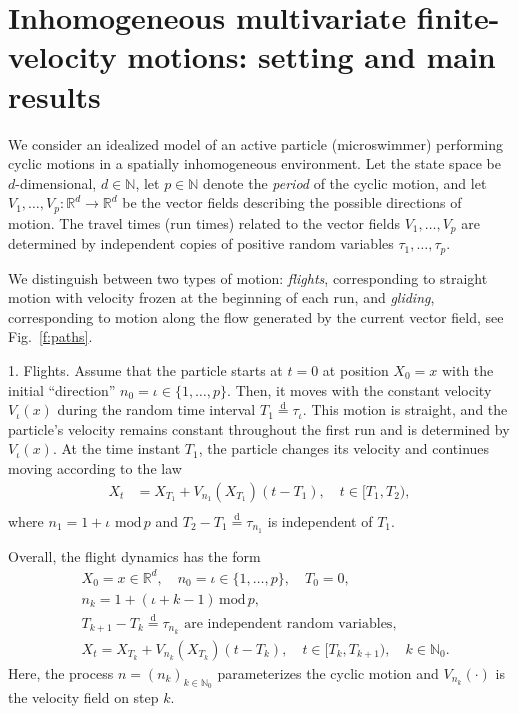 \documentclass[10pt]{article}
\newcommand{\1}{1\!\!\!\;{\rm I}}
\theoremstyle{plain}
\theoremstyle{definition}
\newcommand{\ba}{\begin{equation}\begin{aligned}}
\newcommand{\ea}{\end{aligned}\end{equation}}
\newcommand{\di}{\mathrm{d}}
\newcommand{\bR}{\mathbb{R}}
\numberwithin{equation}{section}
\begin{document}
\section{Inhomogeneous multivariate finite-velocity motions: setting and main results\label{s:setting}}



We consider an idealized model of an active particle (microswimmer) performing cyclic motions in a spatially inhomogeneous environment.
Let the state space be $d$-dimensional, $d\in\mathbb N$,
let $p\in\mathbb{N}$ denote the \emph{period} of the cyclic motion, and
let $V_1,\dots, V_{p}\colon \bR^d\to \bR^d$ be the vector fields describing the possible directions of motion.
The travel times (run times) related to the vector fields $V_1,\dots, V_{p}$ are
determined by independent copies of positive random variables $\tau_1,\dots,\tau_p$.

We distinguish between two types of motion: \emph{flights}, corresponding to straight motion
with velocity frozen at the beginning of each run, and \emph{gliding},
corresponding to motion along the flow generated by the current vector field, see Fig.~\ref{f:paths}.

1. Flights.
Assume that the particle starts at $t=0$ at position $X_0=x$ with the initial ``direction'' $n_0=\iota\in\{1,\dots,p\}$.
Then, it moves with the constant velocity $ V_\iota(x)$ during the random time interval $T_1\stackrel{\di}{=}\tau_\iota$.
This motion is straight, and the particle's velocity remains constant throughout the first run and is determined by
$V_\iota(x)$.
At the time instant $T_1$, the particle changes its velocity
and continues moving according to the law
\ba
X_t&=X_{T_1}+V_{n_1}(X_{T_1})(t-T_1),\quad  t\in[T_1,T_2),\\
\ea
where
$n_1=1+ \iota \text{ mod}\,p$
and
$T_2-T_1\stackrel{\di}{=}\tau_{n_1}$ is independent of $T_1$.

Overall, the flight dynamics has the form
\ba
&X_0=x\in\bR^d,\quad n_0=\iota \in \{1,\dots, p\},\quad T_0=0,\\
&n_k= 1+(\iota + k-1)  \,\mathrm{ mod}\, p,\\
&T_{k+1}-T_k\stackrel{\di }{=}\tau_{n_{k}} \text{ are independent random variables},\\
&X_{t} = X_{T_k} + V_{n_k}(X_{T_k}) (t-T_k),\quad t\in[T_k,T_{k+1}), \quad  k\in\mathbb N_0.
\ea
Here, the process $n=(n_k)_{k\in\mathbb N_0}$ parameterizes the cyclic motion
and $V_{n_k}(\cdot)$ is the velocity field on step $k$.
\end{document}
